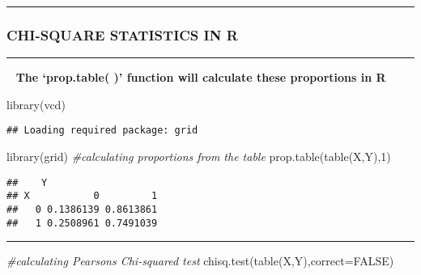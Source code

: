 \documentclass[
]{article}
\newenvironment{Shaded}{\begin{snugshade}}{\end{snugshade}}
\newcommand{\AttributeTok}[1]{\textcolor[rgb]{0.77,0.63,0.00}{#1}}
\newcommand{\CommentTok}[1]{\textcolor[rgb]{0.56,0.35,0.01}{\textit{#1}}}
\newcommand{\ConstantTok}[1]{\textcolor[rgb]{0.00,0.00,0.00}{#1}}
\newcommand{\DecValTok}[1]{\textcolor[rgb]{0.00,0.00,0.81}{#1}}
\newcommand{\FunctionTok}[1]{\textcolor[rgb]{0.00,0.00,0.00}{#1}}
\newcommand{\NormalTok}[1]{#1}
\begin{document}
\begin{center}\rule{0.5\linewidth}{0.5pt}\end{center}

\hypertarget{chi-square-statistics-in-r}{%
\subsubsection{\texorpdfstring{\textbf{CHI-SQUARE STATISTICS IN
R}}{CHI-SQUARE STATISTICS IN R}}\label{chi-square-statistics-in-r}}

\begin{center}\rule{0.5\linewidth}{0.5pt}\end{center}

~ \textbf{The `prop.table( )' function will calculate these proportions
in R}

\begin{Shaded}
\begin{Highlighting}[]
\FunctionTok{library}\NormalTok{(vcd)}
\end{Highlighting}
\end{Shaded}

\begin{verbatim}
## Loading required package: grid
\end{verbatim}

\begin{Shaded}
\begin{Highlighting}[]
\FunctionTok{library}\NormalTok{(grid)}
\CommentTok{\#calculating proportions from the table}
\FunctionTok{prop.table}\NormalTok{(}\FunctionTok{table}\NormalTok{(X,Y),}\DecValTok{1}\NormalTok{)}
\end{Highlighting}
\end{Shaded}

\begin{verbatim}
##    Y
## X           0         1
##   0 0.1386139 0.8613861
##   1 0.2508961 0.7491039
\end{verbatim}

\begin{center}\rule{0.5\linewidth}{0.5pt}\end{center}

\begin{Shaded}
\begin{Highlighting}[]
\CommentTok{\#calculating Pearson\textquotesingle{}s Chi{-}squared test}
\FunctionTok{chisq.test}\NormalTok{(}\FunctionTok{table}\NormalTok{(X,Y),}\AttributeTok{correct=}\ConstantTok{FALSE}\NormalTok{)}
\end{Highlighting}
\end{Shaded}
\end{document}
